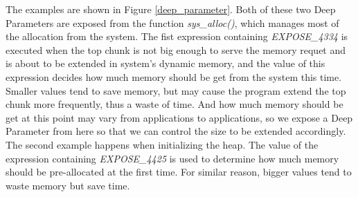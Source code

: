 The examples are shown in Figure \ref{deep_parameter}. Both of these two Deep Parameters are exposed from the function \emph{sys\_alloc()}, which manages most of the allocation from the system. The fist expression containing \emph{EXPOSE\_4334} is executed when the top chunk is not big enough to serve the memory requet and is about to be extended in system's dynamic memory, and the value of this expression decides how much memory should be get from the system this time. Smaller values tend to save memory, but may cause the program extend the top chunk more frequently, thus a waste of time. And how much memory should be get at this point may vary from applications to applications, so we expose a Deep Parameter from here so that we can control the size to be extended accordingly. The second example happens when initializing the heap. The value of the expression containing \emph{EXPOSE\_4425} is used to determine how much memory should be pre-allocated at the first time. For similar reason, bigger values tend to waste memory but save time.
